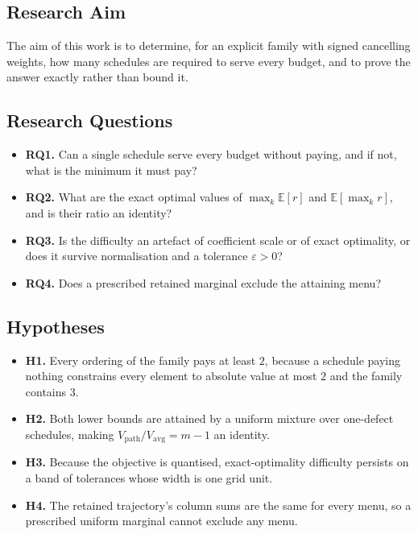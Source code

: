 \subsection{Research Aim}

The aim of this work is to determine, for an explicit family with signed cancelling weights,
how many schedules are required to serve every budget, and to prove the answer exactly rather
than bound it.

\subsection{Research Questions}

\begin{itemize}
\item \textbf{RQ1.} Can a single schedule serve every budget without paying, and if not, what
is the minimum it must pay?
\item \textbf{RQ2.} What are the exact optimal values of $\max_{k}\mathbb{E}[r]$ and
$\mathbb{E}[\max_{k}r]$, and is their ratio an identity?
\item \textbf{RQ3.} Is the difficulty an artefact of coefficient scale or of exact
optimality, or does it survive normalisation and a tolerance $\varepsilon>0$?
\item \textbf{RQ4.} Does a prescribed retained marginal exclude the attaining menu?
\end{itemize}

\subsection{Hypotheses}

\begin{itemize}
\item \textbf{H1.} Every ordering of the family pays at least $2$, because a schedule paying
nothing constrains every element to absolute value at most $2$ and the family contains $3$.
\item \textbf{H2.} Both lower bounds are attained by a uniform mixture over one-defect
schedules, making $V_{\mathrm{path}}/V_{\mathrm{avg}}=m-1$ an identity.
\item \textbf{H3.} Because the objective is quantised, exact-optimality difficulty persists
on a band of tolerances whose width is one grid unit.
\item \textbf{H4.} The retained trajectory's column sums are the same for every menu, so a
prescribed uniform marginal cannot exclude any menu.
\end{itemize}


